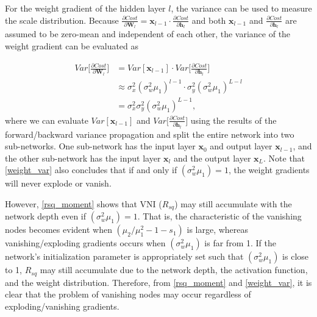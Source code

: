 For the weight gradient of the hidden layer $l$, the variance can be used to measure the scale distribution. Because $\frac{\partial Cost}{\partial \mathbf{W}_l}
=\mathbf{x}_{l-1}\cdot\frac{\partial Cost}{\partial \mathbf{h}_l}$ and both $\mathbf{x}_{l-1}$ and $\frac{\partial Cost}{\partial \mathbf{h}_l}$ are assumed to be zero-mean and independent of each other, the variance of the weight gradient can be evaluated as

\begin{equation}
    \begin{aligned}
    Var\Big[\frac{\partial Cost}{\partial \mathbf{W}_l}\Big]
    &=
    Var[\mathbf{x}_{l-1}]\cdot
    Var\Big[\frac{\partial Cost}{\partial \mathbf{h}_l}\Big]\\
    &
    \approx
    \sigma_x^2(\sigma_w^2\mu_1)^{l-1}\cdot
    \sigma_y^2(\sigma_w^2\mu_1)^{L-l}\\
    &=
    \sigma_x^2\sigma_y^2(\sigma_w^2\mu_1)^{L-1},
    \end{aligned}
    \label{weight_var}
\end{equation}
where we can evaluate $Var[\mathbf{x}_{l-1}]$ and $Var\Big[\frac{\partial Cost}{\partial \mathbf{h}_l}\Big]$ using the results of the forward/backward variance propagation and split the entire network into two sub-networks. One sub-network has the input layer $\mathbf{x}_{0}$ and output layer $\mathbf{x}_{l-1}$, and the other sub-network has the input layer $\mathbf{x}_{l}$ and the output layer $\mathbf{x}_{L}$. Note that \eqref{weight_var} also concludes that if and only if $(\sigma_w^2\mu_1)=1$, the weight gradients will never explode or vanish.

However, \eqref{rsq_moment} shows that VNI ($R_{sq}$) may still accumulate with the network depth even if $(\sigma_w^2\mu_1)=1$. That is, the characteristic of the vanishing nodes becomes evident  when $(\mu_2/\mu_1^2-1-s_1)$ is large, whereas vanishing/exploding gradients occurs when $(\sigma_w^2\mu_1)$ is far from 1. If the network's initialization parameter is appropriately set such that $(\sigma_w^2\mu_1)$ is close to 1, $R_{sq}$ may still accumulate due to the network depth, the activation function, and the weight distribution. Therefore, from \eqref{rsq_moment} and \eqref{weight_var}, it is clear that the problem of vanishing nodes  may occur regardless of  exploding/vanishing gradients.

